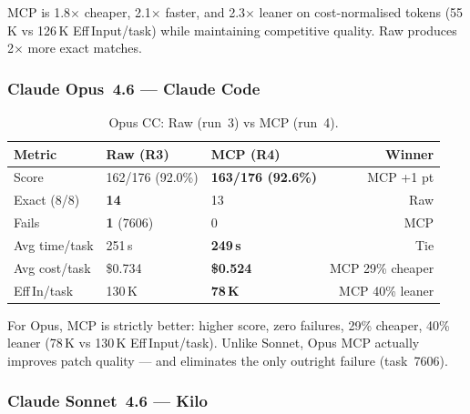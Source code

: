 \noindent
MCP is 1.8$\times$ cheaper, 2.1$\times$ faster, and 2.3$\times$ leaner on
cost-normalised tokens (55\,K vs 126\,K Eff\,Input/task) while maintaining
competitive quality.
Raw produces 2$\times$ more exact matches.

\subsubsection{Claude Opus~4.6 --- Claude Code}

\begin{table}[h]
\centering
\caption{Opus CC: Raw (run~3) vs MCP (run~4).}\label{tab:delta-opus-cc}
\begin{tabular}{lllr}
\toprule
\textbf{Metric} & \textbf{Raw (R3)} & \textbf{MCP (R4)} & \textbf{Winner} \\
\midrule
Score          & 162/176 (92.0\%)  & \textbf{163/176 (92.6\%)} & MCP +1 pt \\
Exact (8/8)    & \textbf{14}       & 13                         & Raw \\
Fails          & \textbf{1} (7606) & 0                          & MCP \\
Avg time/task  & 251\,s            & \textbf{249\,s}            & Tie \\
Avg cost/task  & \$0.734           & \textbf{\$0.524}           & MCP 29\% cheaper \\
Eff\,In/task   & 130\,K            & \textbf{78\,K}             & MCP 40\% leaner \\
\bottomrule
\end{tabular}
\end{table}

\noindent
For Opus, MCP is strictly better: higher score, zero failures, 29\% cheaper,
40\% leaner (78\,K vs 130\,K Eff\,Input/task). Unlike Sonnet, Opus MCP
actually improves patch quality --- and eliminates the only outright failure
(task~7606).

\subsubsection{Claude Sonnet~4.6 --- Kilo}

